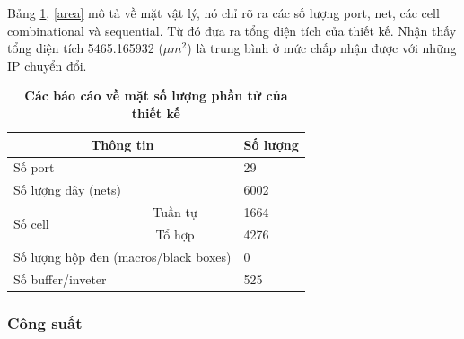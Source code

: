 Bảng \ref{cell}, \ref{area} mô tả về mặt vật lý, nó chỉ rõ ra các số lượng port, net, các cell combinational và sequential. Từ đó đưa ra tổng diện tích của thiết kế.
Nhận thấy tổng diện tích 5465.165932 ($\mu m^2$) là trung bình ở mức chấp nhận được với những IP chuyển đổi.
\begin{table}[H]
\centering
    \caption[Các báo cáo về mặt số lượng phần tử của thiết kế]{\bfseries \fontsize{12pt}{0pt}\selectfont Các báo cáo về mặt số lượng phần tử của thiết kế}
    \begin{tabular}{|lc|l|}
\hline
\multicolumn{2}{|c|}{\textbf{Thông tin}}                    & \multicolumn{1}{c|}{\textbf{Số lượng}} \\ \hline
\multicolumn{2}{|l|}{Số port}                               & 29                                     \\ \hline
\multicolumn{2}{|l|}{Số lượng dây (nets)}                   & 6002                                   \\ \hline
\multicolumn{1}{|l|}{\multirow{2}{*}{Số cell}}   & Tuần tự  & 1664                                   \\ \cline{2-3} 
\multicolumn{1}{|l|}{}                           & Tổ hợp   & 4276                                   \\ \hline
\multicolumn{2}{|l|}{Số lượng hộp đen (macros/black boxes)} & 0                                      \\ \hline
\multicolumn{2}{|l|}{Số buffer/inveter}                     & 525                                    \\ \hline
\end{tabular}
    \label{cell}
    \end{table}

\subsubsection{Công suất}



